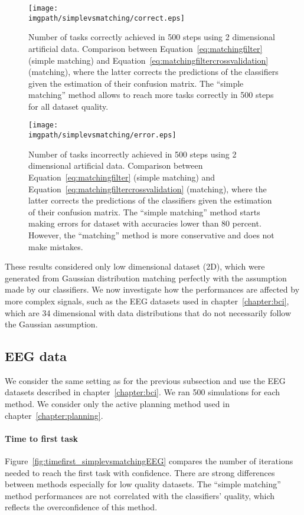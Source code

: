 \begin{figure}[!htbp]
\centering
\texttt{[image: \\imgpath/simplevsmatching/correct.eps]}
\caption{Number of tasks correctly achieved in 500 steps using 2 dimensional artificial data. Comparison between Equation~\ref{eq:matchingfilter} (simple matching) and Equation~\ref{eq:matchingfiltercrossvalidation} (matching), where the latter corrects the predictions of the classifiers given the estimation of their confusion matrix. The ``simple matching'' method allows to reach more tasks correctly in 500 steps for all dataset quality.
}
\label{fig:nCorrect_simplevsmatching}
\end{figure} 

\begin{figure}[!htbp]
\centering
\texttt{[image: \\imgpath/simplevsmatching/error.eps]}
\caption{Number of tasks incorrectly achieved in 500 steps using 2 dimensional artificial data. Comparison between Equation~\ref{eq:matchingfilter} (simple matching) and Equation~\ref{eq:matchingfiltercrossvalidation} (matching), where the latter corrects the predictions of the classifiers given the estimation of their confusion matrix. The ``simple matching'' method starts making errors for dataset with accuracies lower than 80 percent. However, the ``matching'' method is more conservative and does not make mistakes.}
\label{fig:nWrongEEG_simplevsmatching}
\end{figure} 

\transition

These results considered only low dimensional dataset (2D), which were generated from Gaussian distribution matching perfectly with the assumption made by our classifiers. We now investigate how the performances are affected by more complex signals, such as the EEG datasets used in chapter~\ref{chapter:bci}, which are 34 dimensional with data distributions that do not necessarily follow the Gaussian assumption.

\subsection{EEG data}

We consider the same setting as for the previous subsection and use the EEG datasets described in chapter~\ref{chapter:bci}. We ran 500 simulations for each method. We consider only the active planning method used in chapter~\ref{chapter:planning}.

\paragraph{Time to first task} Figure~\ref{fig:timefirst_simplevsmatchingEEG} compares the number of iterations needed to reach the first task with confidence. There are strong differences between methods especially for low quality datasets. The ``simple matching'' method performances are not correlated with the classifiers' quality, which reflects the overconfidence of this method.

